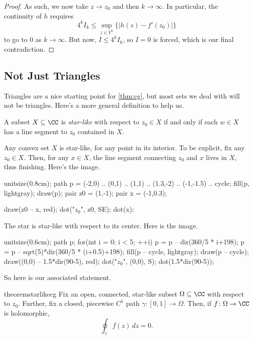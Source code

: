 \begin{proof}
	As such, we now take $z\to z_0$ and then $k\to\infty$. In particular, the continuity of $h$ requires
	\[4^kI_k\le\sup_{z\in V^k}\{|h(z)-f'(z_0)|\}\]
	to go to $0$ as $k\to\infty$. But now, $I\le 4^kI_k$, so $I=0$ is forced, which is our final contradiction.
\end{proof}

\subsection{Not Just Triangles}
Triangles are a nice starting point for \autoref{thm:cg}, but most sets we deal with will not be triangles. Here's a more general definition to help us.
\begin{definition}
	A subset $X\subseteq\CC$ is \textit{star-like} with respect to $z_0\in X$ if and only if each $w\in X$ has a line segment to $z_0$ contained in $X$.
\end{definition}
\begin{example}
	Any convex set $X$ is star-like, for any point in its interior. To be explicit, fix any $z_0\in X$. Then, for any $x\in X$, the line segment connecting $z_0$ and $x$ lives in $X$, thus finishing. Here's the image.
	\begin{center}
		\begin{asy}
			unitsize(0.8cm);
			path p = (-2,0) .. (0,1) .. (1,1) .. (1.3,-2) .. (-1,-1.5) .. cycle;
			fill(p, lightgray);
			draw(p);
			pair z0 = (1,-1);
			pair x = (-1,0.3);

			draw(z0 -- x, red);
			dot("$z_0$", z0, SE);
			dot(x);
		\end{asy}
	\end{center}
\end{example}
\begin{ex}
	The star is star-like with respect to its center. Here is the image.
	\begin{center}
		\begin{asy}
			unitsize(0.6cm);
			path p;
			for(int i = 0; i < 5; ++i)
			{
				p = p -- dir(360/5 * i+198);
				p = p -- sqrt(5)*dir(360/5 * (i+0.5)+198);
			}
			fill(p -- cycle, lightgray);
			draw(p -- cycle);
			draw((0,0) -- 1.5*dir(90-5), red);
			dot("$z_0$", (0,0), S);
			dot(1.5*dir(90-5));
		\end{asy}
	\end{center}
\end{ex}
So here is our associated statement.
\begin{restatable}{theorem}{starlikecg} \label{thm:starlikecg}
	Fix an open, connected, star-like subset $\Omega\subseteq\CC$ with respect to $z_0$. Further, fix a closed, piecewise $C^1$ path $\gamma\colon [0,1]\to\Omega$. Then, if $f\colon \Omega\to\CC$ is holomorphic,
	\[\oint_\gamma f(z)\,dz=0.\]
\end{restatable}
